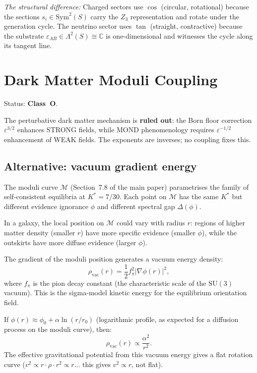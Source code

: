 \documentclass[11pt,a4paper]{article}
\theoremstyle{definition}
\theoremstyle{remark}
\newcommand{\SU}{\mathrm{SU}}
\begin{document}
\emph{The structural difference:} Charged sectors use $\cos$ (circular, rotational) because the sections $s_i\in\mathrm{Sym}^2(S)$ carry the $Z_3$ representation and rotate under the generation cycle. The neutrino sector uses $\tan$ (straight, contractive) because the substrate $\varepsilon_{AB}\in\Lambda^2(S)\cong\mathbb{C}$ is one-dimensional and witnesses the cycle along its tangent line.


\section{Dark Matter Moduli Coupling}\label{sec:dm}

Status: \textbf{Class~O}.

The perturbative dark matter mechanism is \textbf{ruled out}: the Born floor correction $\varepsilon^{3/2}$ enhances STRONG fields, while MOND phenomenology requires $\varepsilon^{-1/2}$ enhancement of WEAK fields. The exponents are inverses; no coupling fixes this.

\subsection{Alternative: vacuum gradient energy}\label{sec:vacuum_gradient}

The moduli curve $\mathcal{M}$ (Section~7.8 of the main paper) parametrises the family of self-consistent equilibria at $K^* = 7/30$. Each point on $\mathcal{M}$ has the same $K^*$ but different evidence ignorance $\phi$ and different spectral gap $\Delta(\phi)$.

In a galaxy, the local position on $\mathcal{M}$ could vary with radius $r$: regions of higher matter density (smaller $r$) have more specific evidence (smaller $\phi$), while the outskirts have more diffuse evidence (larger $\phi$).

The gradient of the moduli position generates a vacuum energy density:
\begin{equation}
\rho_{\mathrm{vac}}(r) = \frac{1}{2} f_\pi^2 |\nabla \phi(r)|^2,
\end{equation}
where $f_\pi$ is the pion decay constant (the characteristic scale of the $\SU(3)$ vacuum). This is the sigma-model kinetic energy for the equilibrium orientation field.

If $\phi(r) \approx \phi_0 + \alpha \ln(r/r_0)$ (logarithmic profile, as expected for a diffusion process on the moduli curve), then:
\begin{equation}
\rho_{\mathrm{vac}}(r) \propto \frac{\alpha^2}{r^2}.
\end{equation}
The effective gravitational potential from this vacuum energy gives a flat rotation curve ($v^2 \propto r \cdot \rho \cdot r^2 \propto r$... this gives $v^2 \propto r$, not flat).
\end{document}
